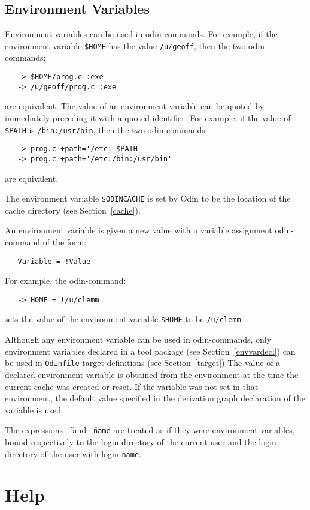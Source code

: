 \documentclass[hidelinks]{report}
\newcommand{\ex}{\tt}   %
\begin{document}
\subsection{Environment Variables}
\label{envvar}

Environment variables can be used in odin-commands.
For example, if the environment variable {\ex \$HOME} has the value
{\ex /u/geoff}, then the two odin-commands:
\begin{verbatim}
   -> $HOME/prog.c :exe
   -> /u/geoff/prog.c :exe
\end{verbatim}
are equivalent.
The value of an environment variable can be quoted by immediately 
preceding it with a quoted identifier.
For example, if the value of {\ex \$PATH} is {\ex /bin:/usr/bin},
then the two odin-commands:
\begin{verbatim}
   -> prog.c +path='/etc:'$PATH
   -> prog.c +path='/etc:/bin:/usr/bin'
\end{verbatim}
are equivalent.

The environment variable {\ex \$ODINCACHE} is set by Odin to be the location
of the cache directory (see Section~\ref{cache}).

An environment variable is given a new value
with a variable assignment odin-command of the form:
\begin{verbatim}
   Variable = !Value
\end{verbatim}
For example, the odin-command:
\begin{verbatim}
   -> HOME = !/u/clemm
\end{verbatim}
sets the value of the environment variable {\ex \$HOME} to be {\ex /u/clemm}.

Although any environment variable can be used in odin-commands,
only environment variables declared in a tool package 
(see Section~\ref{envvardecl}) can be used in
{\ex Odinfile} target definitions (see Section~\ref{target})
The value of a declared environment variable is obtained from the
environment at the time the current cache was created or reset.
If the variable was not set in that environment,
the default value specified in the derivation graph declaration
of the variable is used.

The expressions {\ex \~\,} and {\ex \~\,name} are treated as if they were
environment variables, bound respectively to the login directory of the current
user and the login directory of the user with login {\ex name}.


\section{Help}
\label{help}
\end{document}
